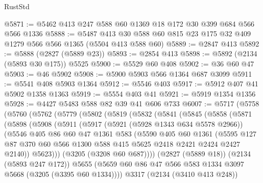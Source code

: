 \begin{lexlean}{RustStd}
\begin{coremodule}
@5871 := @5462 @413 @247 @588 @60 @1369 @18 @172 @30 @399 @684 @566 @566 @1336
@5888 := @5487 @413 @30 @588 @60 @815 @23 @175 @32 @409 @1279 @566 @566 @1365 (@5504 @413 @588 @60)
@5889 := @2847 @413
@5892 := @5888 (@2827 (@5889 @23))
@5893 := @2854 @413
@5898 := @5892 (@2134 (@5893 @30 @175)) @5525
@5900 := @5529 @60 @408
@5902 := @36 @60 @47
@5903 := @46 @5902
@5908 := @5900 @5903 @566 @1364 @687 @3099
@5911 := @5541 @408 @5903 @1364
@5912 := @5546 @403
@5917 := @5912 @407 @41 @5902 @1358 @1363
@5919 := @5554 @403 @41
@5921 := @5919 @1354 @1356
@5928 := @4427 @5483 @588 @82 @39 @41 @606 @733
@6007 := @5717
    (@5758
      (@5760
        (@5762
          (@5779
            (@5802
              (@5819
                (@5832
                  (@5841
                    (@5845
                      (@5858
                        (@5871
                          (@5898
                            (@5908
                              (@5911
                                (@5917
                                  (@5921 (@5928 @1343 @634 @5578 @2966))
                                  (@5546
                                    @405
                                    @86
                                    @60
                                    @47
                                    @1361
                                    @583
                                    (@5590
                                      @405
                                      @60
                                      @1361
                                      (@5595
                                        @127
                                        @87
                                        @370
                                        @60
                                        @566
                                        @1300
                                        @588
                                        @415
                                        @5625
                                        @2418
                                        @2421
                                        @2424
                                        @2427
                                        @2140))
                                    @5623)))
                              (@3205 (@3208 @60 @687))))
                          (@2827 (@5889 @18))
                          (@2134 (@5893 @247 @172))
                          @5655
                          (@5659 @60 @86 @47 @566 @583 @1334 @3097 @5668 (@3205 (@3395 @60 @1334))))
                        @3317
                        (@2134 (@3410 @413 @248))

\end{coremodule}
\end{lexlean}
